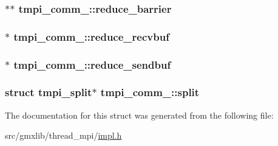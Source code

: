 \hypertarget{structtmpi__comm___af6780e93b3bc7111bfa6b9fc36128fce}{
\subsubsection[{reduce\-\_\-barrier}]{$\ast$$\ast$ {\bf tmpi\-\_\-comm\-\_\-\-::reduce\-\_\-barrier}}}\label{structtmpi__comm___af6780e93b3bc7111bfa6b9fc36128fce}
\hypertarget{structtmpi__comm___acfa6439f7b6888b1749cfa273b6c82ee}{
\subsubsection[{reduce\-\_\-recvbuf}]{ $\ast$ {\bf tmpi\-\_\-comm\-\_\-\-::reduce\-\_\-recvbuf}}}\label{structtmpi__comm___acfa6439f7b6888b1749cfa273b6c82ee}
\hypertarget{structtmpi__comm___a9b3525ea642fa869b35a3a629d02753c}{
\subsubsection[{reduce\-\_\-sendbuf}]{$\ast$ {\bf tmpi\-\_\-comm\-\_\-\-::reduce\-\_\-sendbuf}}}\label{structtmpi__comm___a9b3525ea642fa869b35a3a629d02753c}
\hypertarget{structtmpi__comm___ad7d1db33bbf5ec48dc32691a1e6b202f}{
\subsubsection[{split}]{\setlength{\rightskip}{0pt plus 5cm}struct {\bf tmpi\-\_\-split}$\ast$ {\bf tmpi\-\_\-comm\-\_\-\-::split}}}\label{structtmpi__comm___ad7d1db33bbf5ec48dc32691a1e6b202f}


\-The documentation for this struct was generated from the following file\-:\begin{DoxyCompactItemize}
\item 
src/gmxlib/thread\-\_\-mpi/\hyperlink{impl_8h}{impl.\-h}\end{DoxyCompactItemize}
